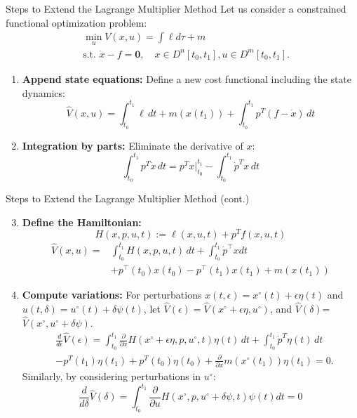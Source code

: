 \documentclass[10pt]{beamer}
\begin{document}
\begin{frame}{Steps to Extend the Lagrange Multiplier Method}
  Let us consider a constrained functional optimization problem:
  \[
    \begin{aligned}
      &\min_u V(x,u)=\int \ell d \tau + m \\
      &\text{s.t. } \dot{x}-f=\mathbf{0}, \quad x\in D^{n}[t_{0},t_{1}], u \in D^{m}[t_{0},t_{1}].
    \end{aligned}
  \]
  \begin{enumerate}
      \item \textbf{Append state equations:} Define a new cost functional including the state dynamics:
      \[
      \hat{V}(x, u) = \int_{t_0}^{t_1} \ell \, dt + m(x(t_1)) + \int_{t_0}^{t_1} p^T (f - \dot{x}) \, dt
      \]
      \item \textbf{Integration by parts:} Eliminate the derivative of \( x \):
      \[
      \int_{t_0}^{t_1} p^T \dot{x} \, dt = p^T x |_{t_0}^{t_1} - \int_{t_0}^{t_1} \dot{p}^T x \, dt
      \]
  \end{enumerate}
\end{frame}

\begin{frame}{Steps to Extend the Lagrange Multiplier Method (cont.)}
  \begin{enumerate}
      \setcounter{enumi}{2}
      \item \textbf{Define the Hamiltonian:}
      \[
      H(x, p, u, t) := \ell(x, u, t) + p^T f(x, u, t)
      \]
      \[
        \begin{aligned}
          \hat{V}(x, u) = &\int_{t_0}^{t_1} H(x, p, u, t) \, dt + \int_{t_0}^{t_1}\dot{p}^{\top}xdt \\ 
          &+ p^{\top}(t_0)x(t_0) - p^{\top}(t_1)x(t_1) + m(x(t_1))
        \end{aligned}
      \]
      \item \textbf{Compute variations:} For perturbations \( x(t, \epsilon) = x^\circ(t) + \epsilon \eta(t) \) and \( u(t, \delta) = u^\circ(t) + \delta \psi(t) \), let \(\hat{V}(\epsilon)=\hat{V}(x^{\circ}+\epsilon \eta,u^{\circ}) \), and \(\hat{V}(\delta)\)=\(\hat{V}(x^{\circ},u^{\circ}+\delta \psi)\).
      \[
      \begin{aligned}
        &\frac{d}{d\epsilon} \hat{V}(\epsilon) = \int_{t_0}^{t_1} \frac{\partial}{\partial x} H(x^\circ + \epsilon \eta, p, u^\circ, t) \eta(t) \, dt + \int_{t_0}^{t_1} \dot{p}^T \eta(t) \, dt \\
        &- p^T(t_1) \eta(t_1) + p^T(t_0) \eta(t_0) + \frac{\partial}{\partial x} m(x^\circ(t_1)) \eta(t_1) = 0.
      \end{aligned}
      \]
      Similarly, by considering perturbations in \( u^{\circ} \):
      \[
         \frac{d}{d\delta} \hat{V}(\delta) =\int_{t_0}^{t_1}\frac{\partial}{\partial u}H(x^{\circ},p,u^{\circ} + \delta \psi,t)\psi(t)dt=0
      \]
  \end{enumerate}
\end{frame}
\end{document}
